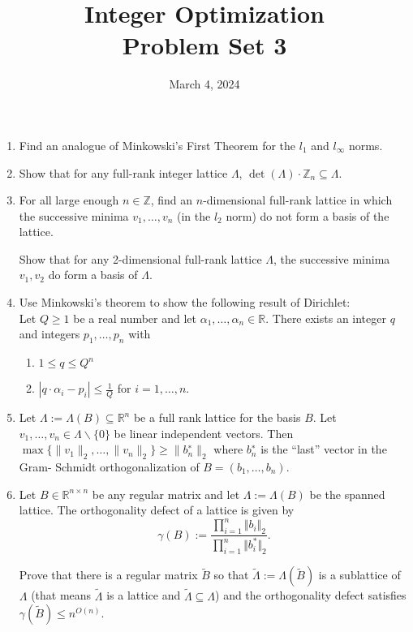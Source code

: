 \documentclass[11pt,a4paper]{article}
\title{Integer Optimization  \\ Problem Set 3 }
\date{ March 4, 2024}
\renewcommand{\leq}{\leqslant}
\renewcommand{\geq}{\geqslant}
\begin{document}
\maketitle 




\begin{enumerate} 

\item Find an analogue of Minkowski’s First Theorem for the $l_1$ and $l_∞$ norms.

\item Show that for any full-rank integer lattice $Λ$, $\det(Λ) \cdot \mathbb{Z}_n ⊆ Λ$.


\item For all large enough $n ∈ \mathbb{Z}$, find an $n$-dimensional full-rank lattice in which the successive minima $v_1, \hdots , v_n$ (in the $l_2$ norm) do not form a basis of the lattice. 

Show that for any 2-dimensional full-rank lattice $Λ$, the successive minima $v_1,v_2$ do form a basis of $Λ$.

\item Use Minkowski’s theorem to show the following result of Dirichlet: \\
Let $Q\geq1$ be a real number and let $α_1,\hdots,α_n ∈\mathbb{R}$. There exists an integer $q$ and integers $p_1,\hdots,p_n$ with
\begin{enumerate}
    \item $1 \leq q \leq Q^n$
    \item $|q\cdot \alpha_i - p_i | \leq \frac{1}{Q}$ for $i = 1, \hdots, n$.  
\end{enumerate}

\item Let $Λ := Λ(B) ⊆ \mathbb{R}^n$ be a full rank lattice for the basis $B$. Let $v_1,\hdots,v_n ∈ Λ\backslash \{0\}$ be linear independent vectors. Then $\max\{∥v_1∥_2,\hdots,∥v_n∥_2\} \geq ∥b^∗_n∥_2$ where $b^∗_n$ is the “last” vector in the Gram- Schmidt orthogonalization of $B = (b_1,\hdots,b_n)$.

\item Let $B ∈ \mathbb{R}^{n×n}$ be any regular matrix and let $Λ := Λ(B)$ be the spanned lattice. The orthogonality defect of a lattice is given by 
$$\gamma(B) := \frac{\prod_{i=1}^n \Vert b_i \Vert_2 }{\prod_{i = 1}^n \Vert b^\ast_i \Vert_2 }.$$

Prove that there is a regular matrix $\tilde{B} $ so that $\tilde{Λ}  := Λ(\tilde{B} )$ is a sublattice of $Λ$ (that means $\tilde{Λ}$  is a lattice and $\tilde{Λ}  ⊆ Λ$) and the orthogonality defect satisfies $γ(\tilde{B} ) \leq n^{O(n)}$.

  

\end{enumerate}



%
%


 
\end{document}
